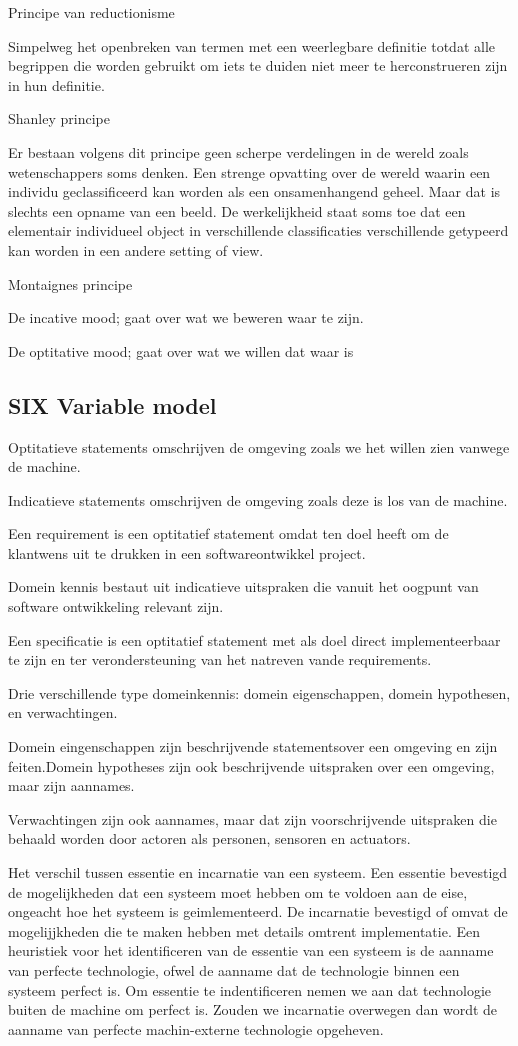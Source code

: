 Principe van reductionisme 

Simpelweg het openbreken van termen met een weerlegbare definitie totdat alle begrippen die worden gebruikt om iets te duiden  niet meer te herconstrueren zijn in hun definitie. 

Shanley principe 

Er bestaan volgens dit principe geen scherpe verdelingen in de wereld zoals wetenschappers soms denken. Een strenge opvatting over de wereld waarin een individu geclassificeerd kan worden als een onsamenhangend geheel. Maar dat is slechts een opname van een beeld. De werkelijkheid staat soms toe dat een elementair individueel object in verschillende classificaties verschillende getypeerd kan worden in een andere setting of view. 

Montaignes principe 

De incative mood; gaat over wat we beweren waar te zijn. 

De optitative mood; gaat over wat we willen dat waar is 
\subsection{SIX Variable model}
Optitatieve statements omschrijven de omgeving zoals we het willen zien vanwege de machine. 

Indicatieve statements omschrijven de omgeving zoals deze is los van de machine. 

Een requirement is een optitatief statement omdat ten doel heeft om de klantwens uit te drukken in een softwareontwikkel project. 

Domein kennis bestaut uit indicatieve uitspraken die vanuit het oogpunt van software ontwikkeling relevant zijn. 

Een specificatie is een optitatief statement met als doel direct implementeerbaar te zijn en ter verondersteuning van het natreven vande requirements. 

Drie verschillende type domeinkennis: domein eigenschappen, domein hypothesen, en verwachtingen. 

Domein eingenschappen  zijn beschrijvende statementsover een omgeving en zijn feiten.Domein hypotheses  zijn ook beschrijvende uitspraken over een omgeving, maar zijn aannames. 

Verwachtingen zijn ook aannames, maar dat zijn voorschrijvende uitspraken die behaald worden door actoren als personen, sensoren en actuators. 

Het verschil tussen essentie en incarnatie van een systeem. Een essentie bevestigd de  mogelijkheden dat een systeem moet hebben om te voldoen aan de eise, ongeacht hoe het systeem is geimlementeerd. De incarnatie bevestigd of omvat de mogelijjkheden die te maken hebben met details omtrent implementatie. Een heuristiek voor het identificeren van de essentie van een systeem is de aanname van perfecte technologie, ofwel de aanname dat de technologie binnen een systeem perfect is. Om essentie te indentificeren nemen we aan dat technologie buiten de machine om perfect is. Zouden we incarnatie overwegen dan wordt de aanname van perfecte machin-externe technologie opgeheven. 

